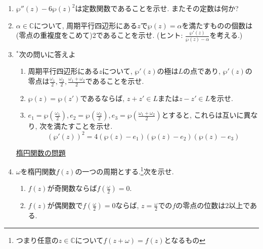 \documentclass[dvipdfmx,a4paper,11pt]{article}
\newcommand{\C}{\mathbb{C}}
\theoremstyle{definition}
\begin{document}
\begin{enumerate}[label=\textbf{問}5.\arabic*]
 \item $\wp''(z) - 6 \wp(z)^2$は定数関数であることを示せ. またその定数は何か?
 \item $\alpha \in \C$について, 周期平行四辺形にある$z$で$\wp(z)=\alpha$を満たすものの個数は(零点の重複度をこめて)2であることを示せ. (ヒント: $\frac{\wp'(z)}{\wp(z) - \alpha}$を考える.)
 
 \item $^{*}$次の問いに答えよ
 \begin{enumerate}
 \item 周期平行四辺形にある$z$について, $\wp'(z)$の極は$L$の点であり, $\wp'(z)$の零点は$ \frac{\omega_1}{2},  \frac{\omega_2}{2},  \frac{\omega_1+\omega_2}{2}$であることを示せ.
 \item $\wp(z)=\wp(z')$であるならば, $z +z' \in L$または$z - z' \in L$を示せ.
 \item $e_1 = \wp(\frac{\omega_1}{2}), e_2 = \wp(\frac{\omega_2}{2}), e_3 = \wp( \frac{\omega_1+\omega_2}{2})$とすると, これらは互いに異なり, 次を満たすことを示せ.
 $$
  (\wp'(z))^2 = 4 (\wp(z)-e_1)(\wp(z)-e_2)(\wp(z)-e_3)
 $$
 \end{enumerate}

\vspace{12pt}
\hspace{-24pt}\underline{楕円関数の問題}

  \item $\omega$を楕円関数$f(z)$の一つの周期とする.\footnote{つまり任意の$z \in \C$について$f(z + \omega) = f(z)$となるもの}次を示せ. 
\begin{enumerate}
\setlength{\parskip}{0cm} 
  \setlength{\itemsep}{0cm} 
 \item $f(z)$が奇関数ならば$f(\frac{\omega}{2})=0$.
 \item $f(z)$が偶関数で$f(\frac{\omega}{2})=0$ならば, $z = \frac{\omega}{2}$での$f$の零点の位数は2以上である. 
      \end{enumerate}  
   
   
   \newpage
   

\end{enumerate}
\end{document}

